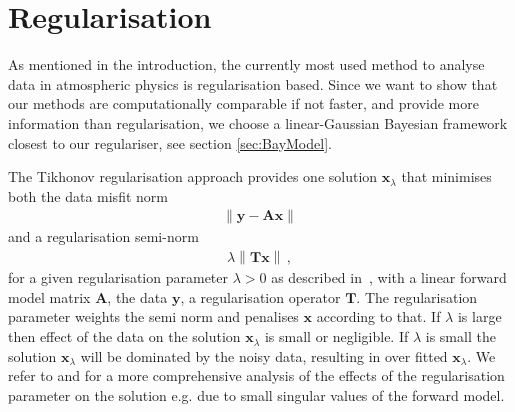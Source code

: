 \section{Regularisation}
\label{sec:regularise}
As mentioned in the introduction, the currently most used method to analyse data in atmospheric physics is regularisation based.
Since we want to show that our methods are computationally comparable if not faster, and provide more information than regularisation, we choose a linear-Gaussian Bayesian framework closest to our regulariser, see section \ref{sec:BayModel}.

The Tikhonov regularisation approach provides one solution $\bm{x}_{\lambda}$ that minimises both the data misfit norm
\begin{align}
	\left\lVert \bm{y} - \bm{A} \bm{x} \right\rVert
\end{align} and a regularisation semi-norm
\begin{align}
	\lambda \left\lVert \bm{T} \bm{x} \right\rVert \, , \label{semiNorm}
\end{align}
for a given regularisation parameter $\lambda > 0 $ as described in~\cite{fox2016fast}, with a linear forward model matrix $\bm{A}$, the data $\bm{y}$, a regularisation operator $\bm{T}$.
The regularisation parameter weights the semi norm and penalises $\bm{x}$ according to that.
If $\lambda$ is large then effect of the data on the solution $\bm{x}_{\lambda}$ is small or negligible.
If $\lambda$ is small the solution $\bm{x}_{\lambda}$ will be dominated by the noisy data, resulting in over fitted $\bm{x}_{\lambda}$.
We refer to  \cite{hansen1989GSVD} and \cite{tan2016LecNot} for a more comprehensive analysis of the effects of the regularisation parameter on the solution e.g. due to small singular values of the forward model.

